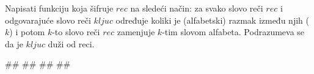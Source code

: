 \begin{Exercise}[label=p2.3_] 
Napisati funkciju  koja šifruje $rec$ na sledeći način: za svako slovo reči
$rec$ i odgovarajuće slovo reči $kljuc$ određuje koliki je
(alfabetski) razmak između njih ($k$) i potom  $k$-to slovo reči $rec$ zamenjuje $k$-tim slovom alfabeta. Podrazumeva se da je $kljuc$ duži od reci. \\ 
\begin{miditest}
\begin{upotreba}{1}
#\naslovInt#
##
##
##
\end{upotreba}
\end{miditest}
\end{Exercise}
\begin{Answer}[ref=p2.3_]
\end{Answer}

\begin{comment}

\end{comment}


